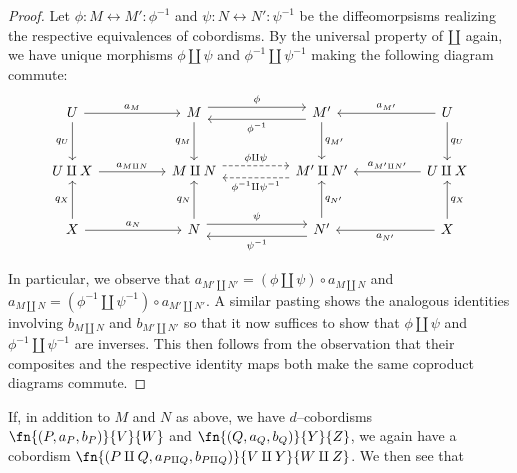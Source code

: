 \begin{proof}
Let $\phi : M \longleftrightarrow M' : \phi^{-1}$ and
$\psi : N \longleftrightarrow N' : \psi^{-1}$ be the diffeomorpsisms realizing
the respective equivalences of cobordisms. By the universal property of $\amalg$
again, we have unique morphisms $\phi \amalg \psi$ and
$\phi^{-1} \amalg \psi^{-1}$ making the following diagram commute:
\begin{eqnarray*}
\begin{tikzcd}[column sep=huge, row sep=large]
  U \arrow[r, "a_{M}"] \arrow[d, "q_{U}" left]
  & M \arrow[r, shift left=1ex, "\phi" above]
      \arrow[d, "q_M" left]
  & M' \arrow[l, shift left=1ex, "\phi^{-1}" below]
       \arrow[d, "q_{M'}" right]
  & U \arrow[l, "a_{M'}" above] \arrow[d, "q_{U}" right]\\
    U \amalg X \arrow[r, "a_{M \amalg N}"]
  & M \amalg N \arrow[r, dashed, shift left=1ex, "\phi \amalg \psi"]
  & M' \amalg N' \arrow[l, dashed, shift left=1ex, "\phi^{-1} \amalg \psi^{-1}"]
  & U \amalg X \arrow[l, "a_{M' \amalg N'}" above]\\
    X \arrow[r, "a_{N}"] \arrow[u, "q_{X}" left]
  & N \arrow[r, shift left=1ex, "\psi" above]
      \arrow[u, "q_N" left]
  & N' \arrow[l, shift left=1ex, "\psi^{-1}" below]
       \arrow[u, "q_{N'}" right]
  & X \arrow[l, "a_{N'}" below] \arrow[u, "q_X" right]
\end{tikzcd}
\end{eqnarray*}

In particular, we observe that $a_{M' \amalg N'}
= (\phi \amalg \psi) \circ a_{M \amalg N}$ and $a_{M \amalg N}
= (\phi^{-1} \amalg \psi^{-1}) \circ a_{M' \amalg N'}$. A similar pasting
shows the analogous identities involving $b_{M \amalg N}$ and $b_{M' \amalg N'}$
so that it now suffices to show that $\phi \amalg \psi$ and
$\phi^{-1} \amalg \psi^{-1}$ are inverses. This then follows from the
observation that their composites and the respective identity maps both make
the same coproduct diagrams commute.
\end{proof}

If, in addition to $M$ and $N$ as
above, we have $d$--cobordisms $\fn{(P, a_{P}, b_{P})}{V}{W}$ and
$\fn{(Q, a_{Q}, b_{Q})}{Y}{Z}$, we again have a cobordism
$\fn{(P \amalg Q, a_{P \amalg Q}, b_{P \amalg Q})}{V \amalg Y}
{W \amalg Z}$. We then see that

